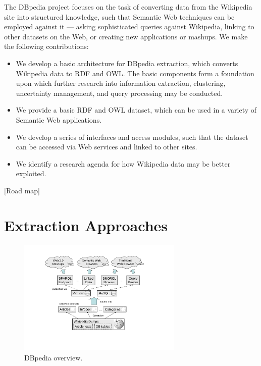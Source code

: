 \documentclass{llncs}
\begin{document}
The DBpedia project focuses on the task of converting data from the
Wikipedia site into structured knowledge, such that Semantic Web
techniques can be employed against it --- asking sophisticated queries
against Wikipedia, linking to other datasets on the Web, or creating
new applications or mashups.  We make the following contributions:

\begin{itemize}

\item We develop a basic architecture for DBpedia extraction, which converts 
Wikipedia data to RDF and OWL.  The basic components form a foundation
upon which further research into information extraction, clustering,
uncertainty management, and query processing may be conducted.

\item We provide a basic RDF and OWL dataset, which can be used in a variety of Semantic 
Web applications.

\item We develop a series of interfaces and access modules, such that the dataset
can be accessed via Web services and linked to other sites.

\item We identify a research agenda for how Wikipedia data may be better exploited.

\end{itemize}

[Road map]


\section{Extraction Approaches}
\label{sec:extraction}

\begin{figure}
	\centering
	\includegraphics[width=0.70\textwidth]{architecture}
	\caption{DBpedia overview.}  \label{fig:architecture}
\end{figure}
\end{document}
